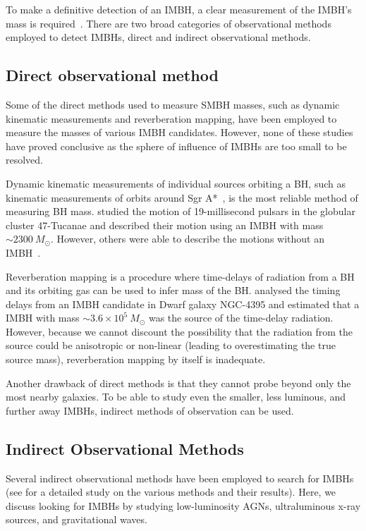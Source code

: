 To make a definitive detection of an IMBH, a clear measurement of the
IMBH's mass is required~\cite{koliopanos2018intermediate}.  There
are two broad categories of observational methods employed to detect
IMBHs, direct and indirect observational methods.

\subsection{Direct observational method}

Some of the direct methods used to measure SMBH masses, such as dynamic
kinematic measurements and reverberation mapping, have been employed
to measure the masses of various IMBH candidates. However, none of these
studies have proved conclusive as the sphere of influence of IMBHs are
too small to be resolved.

Dynamic kinematic measurements of individual sources orbiting a BH, such
as kinematic measurements of orbits around Sgr A*~\cite{sagA}, is the most reliable method of measuring BH
mass. \citet{47TucHostIMBH} studied the motion of 19-millisecond pulsars in the
globular cluster 47-Tucanae and described their motion using an IMBH
with mass ${\sim2300\ M_{\odot}}$. However, others were able to
describe the motions without an IMBH~\cite{freire2017long}.


Reverberation mapping is a procedure where time-delays of radiation from
a BH and its orbiting gas can be used to infer mass of the BH. 
\citet{ncg4395} analysed the timing delays from an IMBH candidate
in Dwarf galaxy NGC-4395 and estimated that a IMBH with mass
${\sim3.6\times10^5\ M_{\odot}}$ was the source of the time-delay
radiation. However, because we cannot discount the possibility that the
radiation from the source could be anisotropic or non-linear (leading to
overestimating the true source mass), reverberation mapping by
itself is inadequate.

Another drawback of direct methods is that they cannot probe beyond
only the most nearby galaxies. To be able to study even the smaller, less
luminous, and further away IMBHs, indirect methods of observation can be
used.

\subsection{Indirect Observational Methods}

Several indirect observational methods have been employed
to search for IMBHs (see \citet{mezcua2017observational} for a detailed
study on the various methods and their results). Here, we discuss
looking for IMBHs by studying low-luminosity AGNs, ultraluminous x-ray
sources, and gravitational waves.

